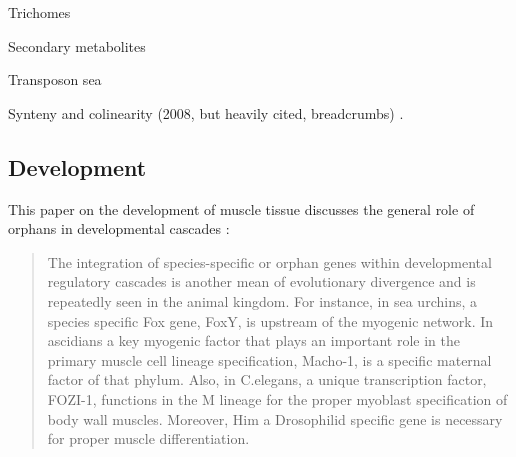     Trichomes

    Secondary metabolites

    Transposon sea

    Synteny and colinearity (2008, but heavily cited, breadcrumbs)
    \cite{tang_synteny_2008}.

\subsection{Development}

  This paper on the development of muscle tissue discusses the general role of
  orphans in developmental cascades \cite{andrikou_too_2015}:

  \begin{quote}
    The integration of species-specific or orphan genes within developmental
    regulatory cascades is another mean of evolutionary divergence and is
    repeatedly seen in the animal kingdom. For instance, in sea urchins, a
    species specific Fox gene, FoxY, is upstream of the myogenic network. In
    ascidians a key myogenic factor that plays an important role in the primary
    muscle cell lineage specification, Macho-1, is a specific maternal factor of
    that phylum. Also, in C.elegans, a unique transcription factor, FOZI-1,
    functions in the M lineage for the proper myoblast specification of body wall
    muscles. Moreover, Him a Drosophilid specific gene is necessary for proper
    muscle differentiation.
  \end{quote}
